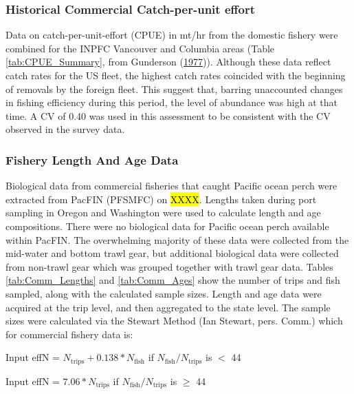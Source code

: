 \documentclass[12pt,]{article}
\begin{document}
\subsubsection{Historical Commercial Catch-per-unit
effort}\label{historical-commercial-catch-per-unit-effort}

Data on catch-per-unit-effort (CPUE) in mt/hr from the domestic fishery
were combined for the INPFC Vancouver and Columbia areas (Table
\ref{tab:CPUE_Summary}, from Gunderson
(\protect\hyperlink{ref-gunderson_population_1977}{1977})). Although
these data reflect catch rates for the US fleet, the highest catch rates
coincided with the beginning of removals by the foreign fleet. This
suggest that, barring unaccounted changes in fishing efficiency during
this period, the level of abundance was high at that time. A CV of 0.40
was used in this assessment to be consistent with the CV observed in the
survey data.

\subsubsection{Fishery Length And Age
Data}\label{fishery-length-and-age-data}

Biological data from commercial fisheries that caught Pacific ocean
perch were extracted from PacFIN (PFSMFC) on \hl{XXXX}. Lengths taken
during port sampling in Oregon and Washington were used to calculate
length and age compositions. There were no biological data for Pacific
ocean perch available within PacFIN. The overwhelming majority of these
data were collected from the mid-water and bottom trawl gear, but
additional biological data were collected from non-trawl gear which was
grouped together with trawl gear data. Tables \ref{tab:Comm_Lengths} and
\ref{tab:Comm_Ages} show the number of trips and fish sampled, along
with the calculated sample sizes. Length and age data were acquired at
the trip level, and then aggregated to the state level. The sample sizes
were calculated via the Stewart Method (Ian Stewart, pers. Comm.) which
for commercial fishery data is:

\begin{centering}

Input effN = $N_{\text{trips}} + 0.138 * N_{\text{fish}}$ if $N_{\text{fish}}/N_{\text{trips}}$ is $<$ 44

Input effN = $7.06 * N_{\text{trips}}$ if $N_{\text{fish}}/N_{\text{trips}}$ is $\geq$ 44

\end{centering}
\end{document}
